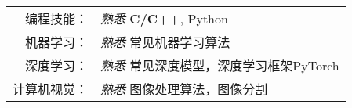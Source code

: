 %
%


 
\renewcommand{\arraystretch}{1.1}

	\begin{tabular}{>{}r>{}p{13cm}} 
		\textsc{编程技能：}     &  \emph{熟悉} \quad \textbf{C/C++}, Python\\  
		\textsc{机器学习：} 	&  \emph{熟悉} \quad  常见机器学习算法 \\
	    \textsc{深度学习：}     &  \emph{熟悉} \quad  常见深度模型，深度学习框架PyTorch \\
		\textsc{计算机视觉：}   &  \emph{熟悉} \quad  图像处理算法，图像分割  \\
	\end{tabular}
	
